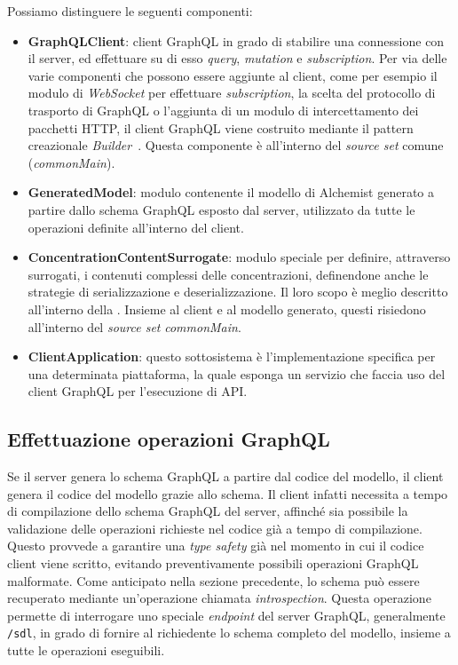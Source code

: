 Possiamo distinguere le seguenti componenti:
\begin{itemize}
    \item \textbf{GraphQLClient}: client GraphQL in grado di stabilire una connessione con il server, ed effettuare su di esso \textit{query}, \textit{mutation} e \textit{subscription}.
        Per via delle varie componenti che possono essere aggiunte al client, come per esempio il modulo di \textit{WebSocket} per effettuare \textit{subscription}, la scelta del protocollo
        di trasporto di GraphQL o l'aggiunta di un modulo di intercettamento dei pacchetti HTTP, il client GraphQL viene costruito mediante il pattern creazionale \textit{Builder}~\cite{design-patterns}.
        Questa componente è all'interno del \textit{source set} comune (\textit{commonMain}).
    \item \textbf{GeneratedModel}: modulo contenente il modello di Alchemist generato a partire dallo schema GraphQL esposto dal server, utilizzato da tutte le operazioni definite all'interno del client.
    \item \textbf{ConcentrationContentSurrogate}: modulo speciale per definire, attraverso surrogati, i contenuti complessi delle concentrazioni, definendone anche le strategie di serializzazione e
        deserializzazione. Il loro scopo è meglio descritto all'interno della . Insieme al client e al modello generato, questi risiedono all'interno del \textit{source set} \textit{commonMain}.
    \item \textbf{ClientApplication}: questo sottosistema è l'implementazione specifica per una determinata piattaforma, la quale esponga un servizio che faccia uso del client GraphQL per l'esecuzione
        di \ac{API}.
\end{itemize}

\subsection{Effettuazione operazioni GraphQL}\label{ssec:client-gql-apis}
Se il server genera lo schema GraphQL a partire dal codice del modello, il client genera il codice del modello grazie allo schema. Il client infatti
necessita a tempo di compilazione dello schema GraphQL del server, affinché sia possibile la validazione delle operazioni richieste nel codice
già a tempo di compilazione. Questo provvede a garantire una \textit{type safety} già nel momento in cui il codice client viene scritto, evitando
preventivamente possibili operazioni GraphQL malformate. Come anticipato nella sezione precedente, lo schema può essere recuperato mediante un'operazione
chiamata \textit{introspection}. Questa operazione permette di interrogare uno speciale \textit{endpoint} del server GraphQL, generalmente \texttt{/sdl},
in grado di fornire al richiedente lo schema completo del modello, insieme a tutte le operazioni eseguibili.

